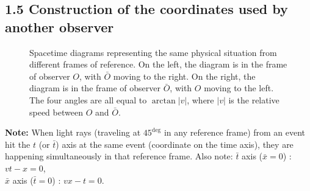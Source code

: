 \documentclass[12pt]{book}
\begin{document}
    \subsection{1.5 Construction of the coordinates used by another observer}
    \begin{figure}[h!]
        \centering
        \caption{Spacetime diagrams representing the same physical situation from different frames of reference. On the left, the diagram is in the frame of observer \(O\), with \(\bar{O}\) moving to the right. On the right, the diagram is in the frame of observer \(\bar{O}\), with \(O\) moving to the left. The four angles are all equal to \(\arctan{|v|}\), where \(|v|\) is the relative speed between \(O\) and \(\bar{O}\).}
        \end{figure}

        \textbf{Note:} When light rays (traveling at \(45^{\deg}\) in any reference frame) from an event hit the \(t\) (or \(\bar{t}\)) axis at the same event (coordinate on the time axis), they are happening simultaneously in that reference frame. Also note:
        \(\bar{t}\) axis (\(\bar{x} = 0\)) : \( vt - x = 0 \),\\
        \(\bar{x}\) axis (\(\bar{t} = 0\)) : \( vx - t = 0 \).
        
\end{document}
